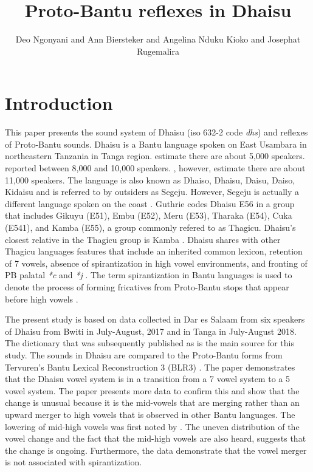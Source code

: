 \documentclass[output=paper,colorlinks,citecolor=brown]{langscibook}
\author{Deo Ngonyani\affiliation{Michigan State University} and Ann Biersteker\affiliation{Michigan State University} and Angelina Nduku Kioko\affiliation{US International University-Africa} and  Josephat Rugemalira\affiliation{Tumaini University Dar es Salaam College}}
\title{Proto-Bantu reflexes in Dhaisu}
\begin{document}
\maketitle

\section{Introduction}\label{sec:ngonyani:1}

This paper presents the sound system of Dhaisu (iso 632-2 code \textit{dhs}) and reflexes of Proto-Bantu sounds. Dhaisu is a Bantu language spoken on East Usambara in northeastern Tanzania in Tanga region. \cite{SimonsFennig2017} estimate there are about 5,000 speakers. \cite[17]{Nurse2000} reported between 8,000 and 10,000 speakers. \cite[2]{RugemaliraEtAl2019}, however, estimate there are about 11,000 speakers. The language is also known as Dhaiso, Dhaisu, Daisu, Daiso, Kidaisu and is referred to by outsiders as Segeju. However, Segeju is actually a different language spoken on the coast \citep{Nurse1982}. Guthrie codes Dhaisu E56 \citep{Guthrie1967, Maho2009} in a group that includes Gikuyu (E51), Embu (E52), Meru (E53), Tharaka (E54), Cuka (E541), and Kamba (E55), a group commonly refered to as Thagicu. Dhaisu's closest relative in the Thagicu group is Kamba \citep{Nurse1982, Nurse2000, Nurse1999}. Dhaisu shares with other Thagicu languages features that include an inherited common lexicon, retention of 7 vowels, absence of spirantization in high vowel environments, and fronting of PB palatal \textit{*c} and \textit{*j} \citep{Nurse1982}. The term spirantization in Bantu languages is used to denote the process of forming fricatives from Proto-Bantu stops that appear before high vowels  \citep{Nurse1982, Schadeberg1995}. 

The present study is based on data collected in Dar es Salaam from six  speakers of Dhaisu from Bwiti in July-August, 2017 and in Tanga in July-August 2018. The dictionary that was subsequently published as \cite{RugemaliraEtAl2019} is the main source for this study. The sounds in Dhaisu are compared to the Proto-Bantu forms from Tervuren's Bantu Lexical Reconstruction 3 (BLR3) \citep{BastinEtAl2002}. The paper demonstrates that the Dhaisu vowel system is in a transition from a 7 vowel system to a 5 vowel system. The paper presents more data to confirm this and show that the change is unusual because it is the mid-vowels that are merging rather than an upward merger to high vowels that is observed in other Bantu languages. The lowering of mid-high vowels was first noted by \cite{Nurse2000}. The uneven distribution of the vowel change and the fact that the mid-high vowels are also heard, suggests that the change is ongoing. Furthermore, the data demonstrate that the vowel merger is not associated with spirantization.
\end{document}
